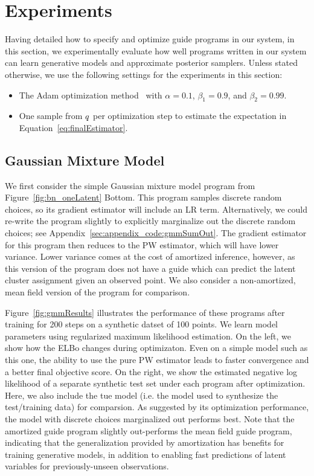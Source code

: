\section{Experiments}
\label{sec:results}

Having detailed how to specify and optimize guide programs in our system, in this section, we experimentally evaluate how well programs written in our system can learn generative models and approximate posterior samplers. Unless stated otherwise, we use the following settings for the experiments in this section:
\begin{itemize}
\item{The Adam optimization method~\cite{Adam} with $\alpha = 0.1$, $\beta_1 = 0.9$, and $\beta_2 = 0.99$.}
\item{One sample from $q$ per optimization step to estimate the expectation in Equation~\ref{eq:finalEstimator}.}
\end{itemize}

\subsection{Gaussian Mixture Model}
\label{sec:results_gmm}

We first consider the simple Gaussian mixture model program from Figure~\ref{fig:bn_oneLatent} Bottom. This program samples discrete random choices, so its gradient estimator will include an LR term. Alternatively, we could re-write the program slightly to explicitly marginalize out the discrete random choices; see Appendix~\ref{sec:appendix_code:gmmSumOut}. The gradient estimator for this program then reduces to the PW estimator, which will have lower variance. Lower variance comes at the cost of amortized inference, however, as this version of the program does not have a guide which can predict the latent cluster assignment given an observed point. We also consider a non-amortized, mean field version of the program for comparison.

Figure~\ref{fig:gmmResults} illustrates the performance of these programs after training for 200 steps on a synthetic datset of 100 points. We learn model parameters using regularized maximum likelihood estimation. On the left, we show how the ELBo changes during optimizaton. Even on a simple model such as this one, the ability to use the pure PW estimator leads to faster convergence and a better final objective score.
On the right, we show the estimated negative log likelihood of a separate synthetic test set under each program after optimization. Here, we also include the tue model (i.e. the model used to synthesize the test/training data) for comparsion.
As suggested by its optimization performance, the model with discrete choices marginalized out performs best.
Note that the amortized guide program slightly out-performs the mean field guide program, indicating that the generalization provided by amortization has benefits for training generative models, in addition to enabling fast predictions of latent variables for previously-unseen observations.

